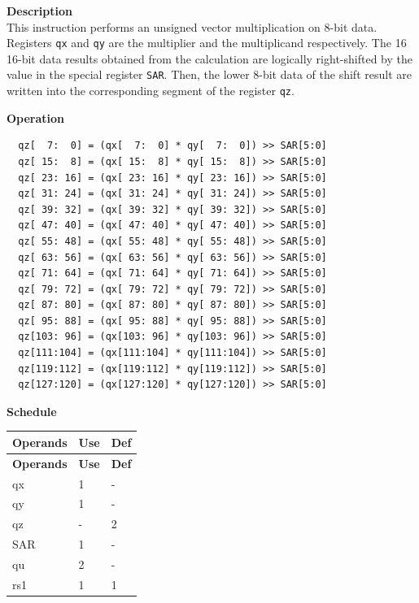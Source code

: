\textbf{Description}\\
This instruction performs an unsigned vector multiplication on 8-bit data. Registers \lstinline{qx} and \lstinline{qy} are the multiplier and the multiplicand respectively. The 16 16-bit data results obtained from the calculation are logically right-shifted by the value in the special register \lstinline{SAR}. Then, the lower 8-bit data of the shift result are written into the corresponding segment of the register \lstinline{qz}.

\textbf{Operation}\\
\begin{lstlisting}
  qz[  7:  0] = (qx[  7:  0] * qy[  7:  0]) >> SAR[5:0]
  qz[ 15:  8] = (qx[ 15:  8] * qy[ 15:  8]) >> SAR[5:0]
  qz[ 23: 16] = (qx[ 23: 16] * qy[ 23: 16]) >> SAR[5:0]
  qz[ 31: 24] = (qx[ 31: 24] * qy[ 31: 24]) >> SAR[5:0]
  qz[ 39: 32] = (qx[ 39: 32] * qy[ 39: 32]) >> SAR[5:0]
  qz[ 47: 40] = (qx[ 47: 40] * qy[ 47: 40]) >> SAR[5:0]
  qz[ 55: 48] = (qx[ 55: 48] * qy[ 55: 48]) >> SAR[5:0]
  qz[ 63: 56] = (qx[ 63: 56] * qy[ 63: 56]) >> SAR[5:0]
  qz[ 71: 64] = (qx[ 71: 64] * qy[ 71: 64]) >> SAR[5:0]
  qz[ 79: 72] = (qx[ 79: 72] * qy[ 79: 72]) >> SAR[5:0]
  qz[ 87: 80] = (qx[ 87: 80] * qy[ 87: 80]) >> SAR[5:0]
  qz[ 95: 88] = (qx[ 95: 88] * qy[ 95: 88]) >> SAR[5:0]
  qz[103: 96] = (qx[103: 96] * qy[103: 96]) >> SAR[5:0]
  qz[111:104] = (qx[111:104] * qy[111:104]) >> SAR[5:0]
  qz[119:112] = (qx[119:112] * qy[119:112]) >> SAR[5:0]
  qz[127:120] = (qx[127:120] * qy[127:120]) >> SAR[5:0]
\end{lstlisting}


\textbf{Schedule}\\
\begin{longtable}[c]{|l|l|l|}
    \hline
    \rowcolor{lightgray}
    \textbf{Operands} & \textbf{Use} & \textbf{Def} \\\hline
    \endfirsthead
    \hline
    \rowcolor{lightgray}
     \textbf{Operands} & \textbf{Use} & \textbf{Def} \\\hline
    \endhead
    \hline
    \endfoot

    qx & 1 & - \\\hline
  qy & 1 & - \\\hline
     qz & - & 2 \\\hline
    SAR & 1 & - \\\hline
    qu & 2 & - \\\hline
    rs1 & 1 & 1

\end{longtable}

